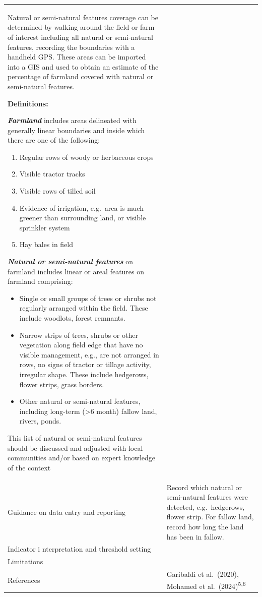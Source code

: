 \documentclass[
  letterpaper,
  DIV=11,
  numbers=noendperiod]{scrreprt}
\begin{document}
\begin{longtable}[]{@{}
  >{\raggedright\arraybackslash}p{}
  >{\raggedright\arraybackslash}p{}@{}}
\begin{minipage}[t]{\linewidth}
Natural or semi-natural features coverage can be determined by walking
around the field or farm of interest including all natural or
semi-natural features, recording the boundaries with a handheld GPS.
These areas can be imported into a GIS and used to obtain an estimate of
the percentage of farmland covered with natural or semi-natural
features.

\textbf{Definitions:}

\textbf{\emph{Farmland}} includes areas delineated with generally linear
boundaries and inside which there are one of the following:

\begin{enumerate}
\def\labelenumi{\arabic{enumi}.}
\item
  Regular rows of woody or herbaceous crops
\item
  Visible tractor tracks
\item
  Visible rows of tilled soil
\item
  Evidence of irrigation, e.g.~area is much greener than surrounding
  land, or visible sprinkler system
\item
  Hay bales in field
\end{enumerate}

\textbf{\emph{Natural or semi-natural features}} on farmland includes
linear or areal features on farmland comprising:

\begin{itemize}
\item
  Single or small groups of trees or shrubs not regularly arranged
  within the field. These include woodlots, forest remnants.
\item
  Narrow strips of trees, shrubs or other vegetation along field edge
  that have no visible management, e.g., are not arranged in rows, no
  signs of tractor or tillage activity, irregular shape. These include
  hedgerows, flower strips, grass borders.
\item
  Other natural or semi-natural features, including long-term
  (\textgreater6 month) fallow land, rivers, ponds.
\end{itemize}

This list of natural or semi-natural features should be discussed and
adjusted with local communities and/or based on expert knowledge of the
context
\end{minipage} \\
Guidance on data entry and reporting & Record which natural or
semi-natural features were detected, e.g.~hedgerows, flower strip. For
fallow land, record how long the land has been in fallow. \\
Indicator i nterpretation and threshold setting & \\
Limitations & \\
References & Garibaldi et al.~(2020), Mohamed et
al.~(2024)\textsuperscript{5,6} \\
\end{longtable}
\end{document}
